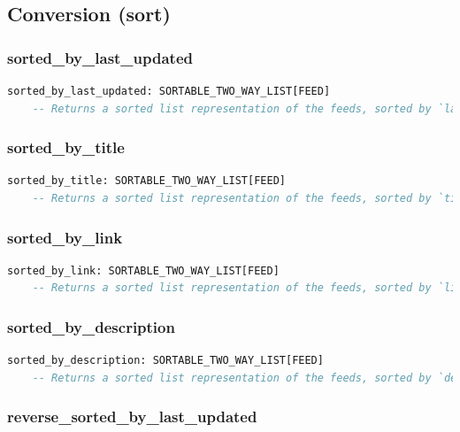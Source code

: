 \subsection{Conversion (sort)}
\label{sec:feed-manager-conversion-sort}

\subsubsection{sorted\_by\_last\_updated}

\begin{lstlisting}[language=Eiffel]
sorted_by_last_updated: SORTABLE_TWO_WAY_LIST[FEED]
    -- Returns a sorted list representation of the feeds, sorted by `last_updated'
\end{lstlisting}

\subsubsection{sorted\_by\_title}

\begin{lstlisting}[language=Eiffel]
sorted_by_title: SORTABLE_TWO_WAY_LIST[FEED]
    -- Returns a sorted list representation of the feeds, sorted by `title'
\end{lstlisting}

\subsubsection{sorted\_by\_link}

\begin{lstlisting}[language=Eiffel]
sorted_by_link: SORTABLE_TWO_WAY_LIST[FEED]
    -- Returns a sorted list representation of the feeds, sorted by `link'
\end{lstlisting}

\subsubsection{sorted\_by\_description}

\begin{lstlisting}[language=Eiffel]
sorted_by_description: SORTABLE_TWO_WAY_LIST[FEED]
    -- Returns a sorted list representation of the feeds, sorted by `description'
\end{lstlisting}

\subsubsection{reverse\_sorted\_by\_last\_updated}

